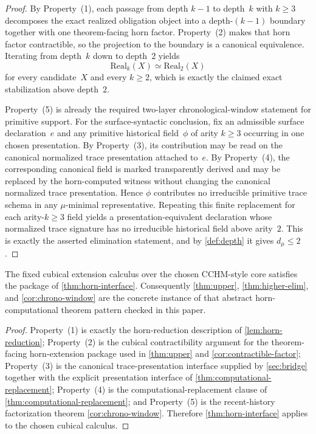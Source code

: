 \documentclass{lmcs}
\newcommand{\Real}{\mathrm{Real}}
\begin{document}
\begin{proof}
By Property~(1), each passage from depth $k-1$ to depth~$k$ with $k \geq 3$ decomposes the exact realized obligation object into a depth-$(k-1)$ boundary together with one theorem-facing horn factor. Property~(2) makes that horn factor contractible, so the projection to the boundary is a canonical equivalence. Iterating from depth~$k$ down to depth~$2$ yields
\[
  \Real_k(X) \simeq \Real_2(X)
\]
for every candidate~$X$ and every $k \geq 2$, which is exactly the claimed exact stabilization above depth~$2$.

Property~(5) is already the required two-layer chronological-window statement for primitive support. For the surface-syntactic conclusion, fix an admissible surface declaration~$e$ and any primitive historical field~$\phi$ of arity $k \geq 3$ occurring in one chosen presentation. By Property~(3), its contribution may be read on the canonical normalized trace presentation attached to~$e$. By Property~(4), the corresponding canonical field is marked transparently derived and may be replaced by the horn-computed witness without changing the canonical normalized trace presentation. Hence $\phi$ contributes no irreducible primitive trace schema in any $\mu$-minimal representative. Repeating this finite replacement for each arity-$k \geq 3$ field yields a presentation-equivalent declaration whose normalized trace signature has no irreducible historical field above arity~$2$. This is exactly the asserted elimination statement, and by \autoref{def:depth} it gives $d_\mu \leq 2$.
\end{proof}

\begin{cor}
\label{cor:cubical-horn-interface}
The fixed cubical extension calculus over the chosen CCHM-style core satisfies the package of \autoref{thm:horn-interface}. Consequently \autoref{thm:upper}, \autoref{thm:higher-elim}, and \autoref{cor:chrono-window} are the concrete instance of that abstract horn-computational theorem pattern checked in this paper.
\end{cor}

\begin{proof}
Property~(1) is exactly the horn-reduction description of \autoref{lem:horn-reduction}; Property~(2) is the cubical contractibility argument for the theorem-facing horn-extension package used in \autoref{thm:upper} and \autoref{cor:contractible-factor}; Property~(3) is the canonical trace-presentation interface supplied by \autoref{sec:bridge} together with the explicit presentation interface of \autoref{thm:computational-replacement}; Property~(4) is the computational-replacement clause of \autoref{thm:computational-replacement}; and Property~(5) is the recent-history factorization theorem \autoref{cor:chrono-window}. Therefore \autoref{thm:horn-interface} applies to the chosen cubical calculus.
\end{proof}
\end{document}

